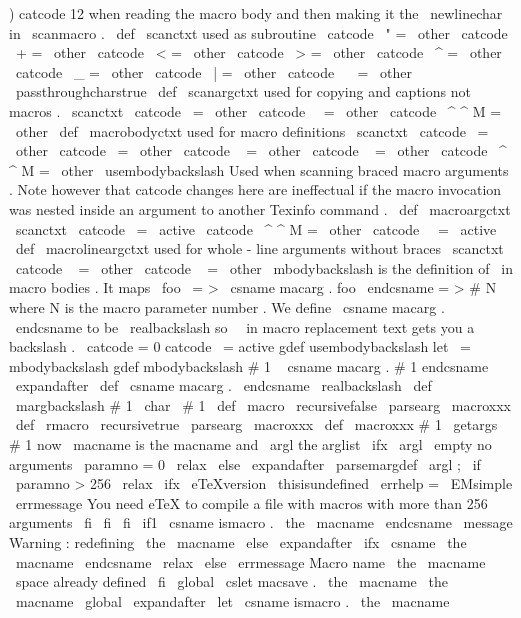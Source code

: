 {{{)
catcode
12
when
reading
the
macro
%
body
and
then
making
it
the
\
newlinechar
in
\
scanmacro
.
%
\
def
\
scanctxt
{
%
used
as
subroutine
\
catcode
\
"
=
\
other
\
catcode
\
+
=
\
other
\
catcode
\
<
=
\
other
\
catcode
\
>
=
\
other
\
catcode
\
^
=
\
other
\
catcode
\
_
=
\
other
\
catcode
\
|
=
\
other
\
catcode
\
~
=
\
other
\
passthroughcharstrue
}
\
def
\
scanargctxt
{
%
used
for
copying
and
captions
not
macros
.
\
scanctxt
\
catcode
\
=
\
other
\
catcode
\
\
=
\
other
\
catcode
\
^
^
M
=
\
other
}
\
def
\
macrobodyctxt
{
%
used
for
macro
definitions
\
scanctxt
\
catcode
\
=
\
other
\
catcode
\
=
\
other
\
catcode
\
{
=
\
other
\
catcode
\
}
=
\
other
\
catcode
\
^
^
M
=
\
other
\
usembodybackslash
}
%
Used
when
scanning
braced
macro
arguments
.
Note
however
that
catcode
%
changes
here
are
ineffectual
if
the
macro
invocation
was
nested
inside
%
an
argument
to
another
Texinfo
command
.
\
def
\
macroargctxt
{
%
\
scanctxt
\
catcode
\
=
\
active
\
catcode
\
^
^
M
=
\
other
\
catcode
\
\
=
\
active
}
\
def
\
macrolineargctxt
{
%
used
for
whole
-
line
arguments
without
braces
\
scanctxt
\
catcode
\
{
=
\
other
\
catcode
\
}
=
\
other
}
%
\
mbodybackslash
is
the
definition
of
\
in
macro
bodies
.
%
It
maps
\
foo
\
=
>
\
csname
macarg
.
foo
\
endcsname
=
>
#
N
%
where
N
is
the
macro
parameter
number
.
%
We
define
\
csname
macarg
.
\
endcsname
to
be
\
realbackslash
so
%
\
\
in
macro
replacement
text
gets
you
a
backslash
.
%
{
\
catcode
=
0
catcode
\
=
active
gdef
usembodybackslash
{
let
\
=
mbodybackslash
}
gdef
mbodybackslash
#
1
\
{
csname
macarg
.
#
1
endcsname
}
}
\
expandafter
\
def
\
csname
macarg
.
\
endcsname
{
\
realbackslash
}
\
def
\
margbackslash
#
1
{
\
char
\
#
1
}
\
def
\
macro
{
\
recursivefalse
\
parsearg
\
macroxxx
}
\
def
\
rmacro
{
\
recursivetrue
\
parsearg
\
macroxxx
}
\
def
\
macroxxx
#
1
{
%
\
getargs
{
#
1
}
%
now
\
macname
is
the
macname
and
\
argl
the
arglist
\
ifx
\
argl
\
empty
%
no
arguments
\
paramno
=
0
\
relax
\
else
\
expandafter
\
parsemargdef
\
argl
;
%
\
if
\
paramno
>
256
\
relax
\
ifx
\
eTeXversion
\
thisisundefined
\
errhelp
=
\
EMsimple
\
errmessage
{
You
need
eTeX
to
compile
a
file
with
macros
with
more
than
256
arguments
}
\
fi
\
fi
\
fi
\
if1
\
csname
ismacro
.
\
the
\
macname
\
endcsname
\
message
{
Warning
:
redefining
\
the
\
macname
}
%
\
else
\
expandafter
\
ifx
\
csname
\
the
\
macname
\
endcsname
\
relax
\
else
\
errmessage
{
Macro
name
\
the
\
macname
\
space
already
defined
}
\
fi
\
global
\
cslet
{
macsave
.
\
the
\
macname
}
{
\
the
\
macname
}
%
\
global
\
expandafter
\
let
\
csname
ismacro
.
\
the
\
macname
}}}}
